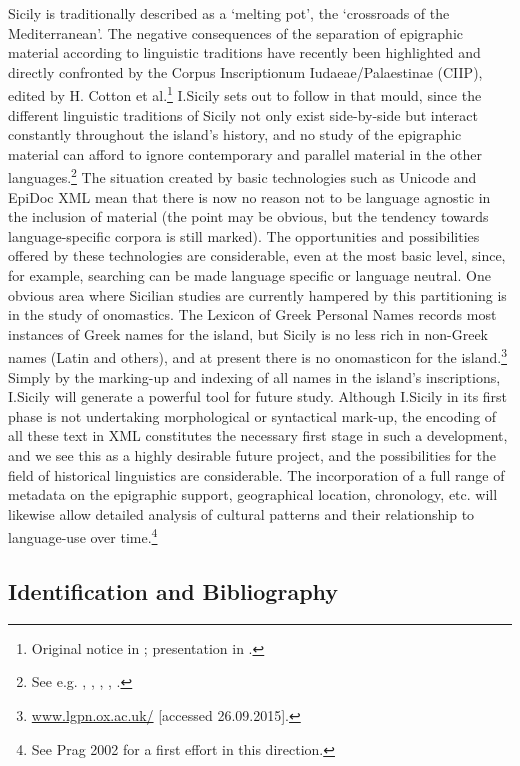 \documentclass[amsthm,ebook]{saparticle}
\begin{document}
\noindent Sicily is traditionally described as a `melting pot', the `crossroads of the Mediterranean'. The negative consequences
of the separation of epigraphic material according to linguistic traditions have recently been highlighted and directly
confronted by the Corpus Inscriptionum Iudaeae/Palaestinae (CIIP), edited by H. Cotton et al.\footnote{ Original notice
in \citet{cotton_corpus_1999}; presentation in \citet{cotton_corpus_2010}.} I.Sicily sets out to follow in that mould, since the
different linguistic traditions of Sicily not only exist side-by-side but interact constantly throughout the island’s
history, and no study of the epigraphic material can afford to ignore contemporary and parallel material in the other
languages.\footnote{ See e.g. \citet{manganaro_greco_1993}, \citet{prag_epigraphy_2002}, \citet{salmeri_i_2004}, \citet{korhonen_language_2011}, \citet{tribulato_language_2012}.} The situation
created by basic technologies such as Unicode and EpiDoc XML mean that there is now no reason not to be language
agnostic in the inclusion of material (the point may be obvious, but the tendency towards language-specific corpora is
still marked). The opportunities and possibilities offered by these technologies are considerable, even at the most
basic level, since, for example, searching can be made language specific or language neutral. One obvious area where
Sicilian studies are currently hampered by this partitioning is in the study of onomastics. The Lexicon of Greek
Personal Names records most instances of Greek names for the island, but Sicily is no less rich in non-Greek names
(Latin and others), and at present there is no onomasticon for the island.\footnote{ \url{www.lgpn.ox.ac.uk/} [accessed
26.09.2015].} Simply by the marking-up and indexing of all names in the island’s inscriptions, I.Sicily will generate a
powerful tool for future study. Although I.Sicily in its first phase is not undertaking morphological or syntactical
mark-up, the encoding of all these text in XML constitutes the necessary first stage in such a development, and we see
this as a highly desirable future project, and the possibilities for the field of historical linguistics are
considerable. The incorporation of a full range of metadata on the epigraphic support, geographical location,
chronology, etc. will likewise allow detailed analysis of cultural patterns and their relationship to language-use over
time.\footnote{ See Prag 2002 for a first effort in this direction.}




\subsection{Identification and Bibliography}
\end{document}
